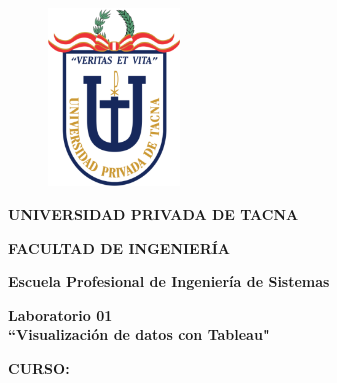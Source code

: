 \documentclass[12pt,letterpaper]{article}
\begin{document}
    \begin{titlepage}
        \begin{center}
            \begin{figure}[htb]
                \begin{center}
                    \includegraphics[width=3.5cm]{./img/logo}
                \end{center}
            \end{figure}
            \vspace*{0.15in}
            \begin{Large}
                \textbf{UNIVERSIDAD PRIVADA DE TACNA}\\
            \end{Large}
            \vspace*{0.15in}
            \begin{Large}
                \textbf{FACULTAD DE INGENIERÍA} \\
            \end{Large}
            \vspace*{0.1in}
            \begin{Large}
                \textbf{Escuela Profesional de Ingeniería de Sistemas} \\
            \end{Large}
            \vspace*{0.3in}
            \begin{Large}
                \textbf{Laboratorio 01}\\
                \textbf{``Visualización de datos con Tableau"}\\
            \end{Large}
            \vspace*{0.2in}
            \begin{Large}
                \textbf{CURSO:} \\
            \end{Large}
            \vspace*{0.1in}
            \begin{large}

\end{large}
\end{center}
\end{titlepage}
\end{document}
